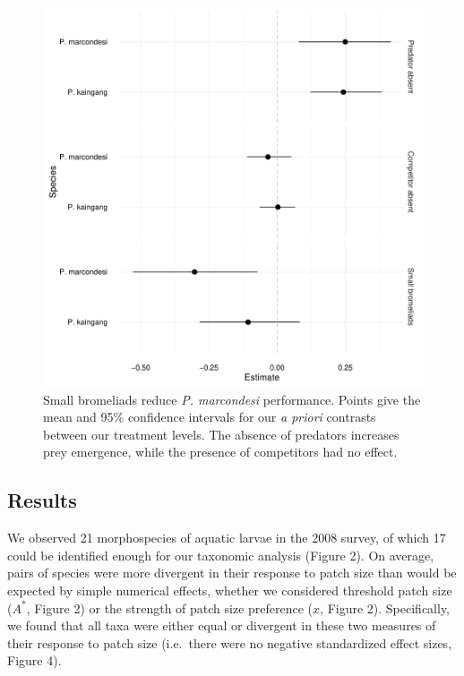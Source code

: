 \begin{figure}[htbp]
\centering
\includegraphics[width=5.5in]{figures/confints.pdf}
\caption[Small bromeliads reduce \emph{P. marcondesi} performance.]{Small bromeliads reduce \emph{P. marcondesi} performance. Points give the mean and 95\% confidence intervals for our \emph{a priori} contrasts between our treatment levels. The absence of predators increases prey emergence, while the presence of competitors had no effect.}
\end{figure}


\subsection{Results}\label{results}

We observed 21 morphospecies of aquatic larvae in the 2008 survey, of
which 17 could be identified enough for our taxonomic analysis (Figure
2). On average, pairs of species were more divergent in their response
to patch size than would be expected by simple numerical effects,
whether we considered threshold patch size (\(A^{*}\), Figure 2) or the
strength of patch size preference (\(x\), Figure 2). Specifically, we
found that all taxa were either equal or divergent in these two measures
of their response to patch size (i.e.~there were no negative
standardized effect sizes, Figure 4).

